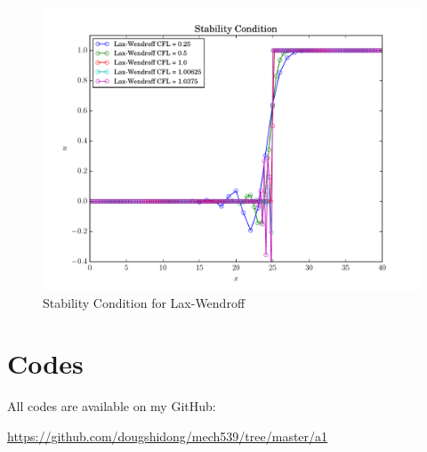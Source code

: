 \documentclass[letterpaper,12pt,]{article}
\begin{document}
\begin{figure}
    \centering
    \includegraphics[width = \textwidth]{./Figures/q4_2}
    \caption{Stability Condition for Lax-Wendroff}
    \label{fig:q2}
\end{figure}





\section*{Codes}

All codes are available on my GitHub:

\url{https://github.com/dougshidong/mech539/tree/master/a1}
\end{document}
